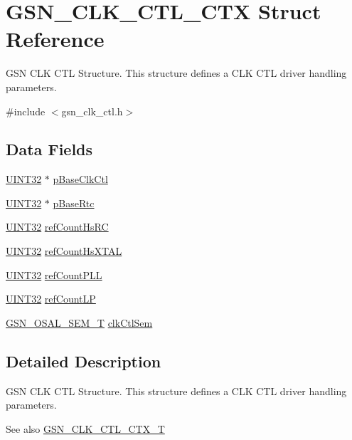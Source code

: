 \hypertarget{a00039}{
\section{GSN\_\-CLK\_\-CTL\_\-CTX Struct Reference}
\label{a00039}
}


GSN CLK CTL Structure. This structure defines a CLK CTL driver handling parameters.  




{\ttfamily \#include $<$gsn\_\-clk\_\-ctl.h$>$}

\subsection*{Data Fields}
\begin{DoxyCompactItemize}
\item 
\hyperlink{a00660_gae1e6edbbc26d6fbc71a90190d0266018}{UINT32} $\ast$ \hyperlink{a00039_a4d9db25bd3b3c581127abb8a496b7cdc}{pBaseClkCtl}
\item 
\hyperlink{a00660_gae1e6edbbc26d6fbc71a90190d0266018}{UINT32} $\ast$ \hyperlink{a00039_a0ce3025a2f8b06c8b5338d0c04c16fa2}{pBaseRtc}
\item 
\hyperlink{a00660_gae1e6edbbc26d6fbc71a90190d0266018}{UINT32} \hyperlink{a00039_afef2b349725cb1d892034d5329f37353}{refCountHsRC}
\item 
\hyperlink{a00660_gae1e6edbbc26d6fbc71a90190d0266018}{UINT32} \hyperlink{a00039_abbc5b430ee0af80605a63e15113d9ff2}{refCountHsXTAL}
\item 
\hyperlink{a00660_gae1e6edbbc26d6fbc71a90190d0266018}{UINT32} \hyperlink{a00039_a4ed9595eb4009f786890647770869c2f}{refCountPLL}
\item 
\hyperlink{a00660_gae1e6edbbc26d6fbc71a90190d0266018}{UINT32} \hyperlink{a00039_afa083078d88cb45aba0849e5faf4eda1}{refCountLP}
\item 
\hyperlink{a00628_gab4b3554407ce22b940e2fcd3faf5fd47}{GSN\_\-OSAL\_\-SEM\_\-T} \hyperlink{a00039_a8f4222b161f244e325365d98301fd760}{clkCtlSem}
\end{DoxyCompactItemize}


\subsection{Detailed Description}
GSN CLK CTL Structure. This structure defines a CLK CTL driver handling parameters. 

\begin{DoxySeeAlso}{See also}
\hyperlink{a00644_ga9e7d0d37ecaac3d985e5618e1c8c57d5}{GSN\_\-CLK\_\-CTL\_\-CTX\_\-T} 
\end{DoxySeeAlso}



